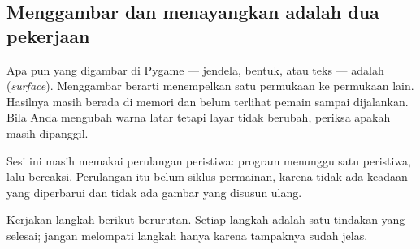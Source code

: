 \subsection*{Menggambar dan menayangkan adalah dua pekerjaan}

Apa pun yang digambar di Pygame --- jendela, bentuk, atau teks --- adalah
 (\emph{surface}). Menggambar berarti menempelkan satu
permukaan ke permukaan lain. Hasilnya masih berada di memori dan belum
terlihat pemain sampai  dijalankan. Bila Anda mengubah warna
latar tetapi layar tidak berubah, periksa apakah  masih
dipanggil.

Sesi ini masih memakai perulangan peristiwa: program menunggu satu peristiwa,
lalu bereaksi. Perulangan itu belum siklus permainan, karena tidak ada
keadaan yang diperbarui dan tidak ada gambar yang disusun ulang.


Kerjakan langkah berikut berurutan. Setiap langkah adalah satu tindakan yang
selesai; jangan melompati langkah hanya karena tampaknya sudah jelas.

